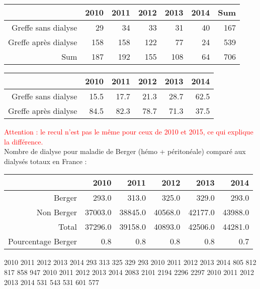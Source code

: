 \documentclass[11pt,a4paper]{article}\usepackage[]{graphicx}\usepackage[]{color}
\begin{document}
\begin{table}[H]
\centering
\begin{tabular}{rrrrrrr}
  \hline
 & 2010 & 2011 & 2012 & 2013 & 2014 & Sum \\ 
  \hline
Greffe sans dialyse & 29 & 34 & 33 & 31 & 40 & 167 \\ 
  Greffe après dialyse & 158 & 158 & 122 & 77 & 24 & 539 \\ 
  Sum & 187 & 192 & 155 & 108 & 64 & 706 \\ 
   \hline
\end{tabular}
\end{table}
\begin{table}[H]
\centering
\begin{tabular}{rrrrrr}
  \hline
 & 2010 & 2011 & 2012 & 2013 & 2014 \\ 
  \hline
Greffe sans dialyse & 15.5 & 17.7 & 21.3 & 28.7 & 62.5 \\ 
  Greffe après dialyse & 84.5 & 82.3 & 78.7 & 71.3 & 37.5 \\ 
   \hline
\end{tabular}
\end{table}


\textcolor{red}{Attention : le recul n'est pas le même pour ceux de 2010 et 2015, ce qui explique la différence.}
~\\

Nombre de dialyse pour maladie de Berger (hémo + péritonéale) comparé aux dialysés totaux en France :

\begin{table}[ht]
\centering
\begin{tabular}{rrrrrr}
  \hline
 & 2010 & 2011 & 2012 & 2013 & 2014 \\ 
  \hline
Berger & 293.0 & 313.0 & 325.0 & 329.0 & 293.0 \\ 
  Non Berger & 37003.0 & 38845.0 & 40568.0 & 42177.0 & 43988.0 \\ 
  Total & 37296.0 & 39158.0 & 40893.0 & 42506.0 & 44281.0 \\ 
  Pourcentage Berger & 0.8 & 0.8 & 0.8 & 0.8 & 0.7 \\ 
   \hline
\end{tabular}
\end{table}
2010 2011 2012 2013 2014 
 293  313  325  329  293 
2010 2011 2012 2013 2014 
 805  812  817  858  947 
2010 2011 2012 2013 2014 
2083 2101 2194 2296 2297 
2010 2011 2012 2013 2014 
 531  543  531  601  577 
\end{document}
